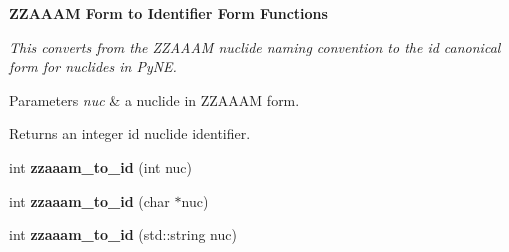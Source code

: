 \begin{Indent}{\bf Z\-Z\-A\-A\-A\-M Form to Identifier Form Functions}\par
{\em This converts from the Z\-Z\-A\-A\-A\-M nuclide naming convention to the id canonical form for nuclides in Py\-N\-E. 
\begin{DoxyParams}{Parameters}
{\em nuc} & a nuclide in Z\-Z\-A\-A\-A\-M form. \\
\hline
\end{DoxyParams}
\begin{DoxyReturn}{Returns}
an integer id nuclide identifier. 
\end{DoxyReturn}
}\begin{DoxyCompactItemize}
\item 
\hypertarget{namespacepyne_1_1nucname_a91692dd60121331c14b1dbf0a37019d5}{int {\bfseries zzaaam\-\_\-to\-\_\-id} (int nuc)}\label{namespacepyne_1_1nucname_a91692dd60121331c14b1dbf0a37019d5}

\item 
\hypertarget{namespacepyne_1_1nucname_af59c86aa17bc9828820f118521b6f7f4}{int {\bfseries zzaaam\-\_\-to\-\_\-id} (char $\ast$nuc)}\label{namespacepyne_1_1nucname_af59c86aa17bc9828820f118521b6f7f4}

\item 
\hypertarget{namespacepyne_1_1nucname_ac99a1d1c1e89b821823e3f2cc8bd8070}{int {\bfseries zzaaam\-\_\-to\-\_\-id} (std\-::string nuc)}\label{namespacepyne_1_1nucname_ac99a1d1c1e89b821823e3f2cc8bd8070}

\end{DoxyCompactItemize}
\end{Indent}
